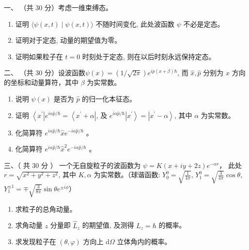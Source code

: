 
一、
	（共 30 分）考虑一维束缚态。
	\begin{enumerate}
		\item
		证明 $\langle\psi(x, t) \mid \psi(x, t)\rangle$ 不随时间变化, 此处波函数 $\psi$ 不必是定态。
		\item 
		证明对于定态, 动量的期望值为零。
		\item 
		证明如果粒子在 $t=0$ 时刻处于定态, 则在以后时刻永远保持定态。
		
		
		
	\end{enumerate}

二、	（共 30 分）设波函数$\psi(x)=(1 / \sqrt{2 \pi}) e^{i p(x+\beta) \hbar}$, 而 $\hat{x}, \hat{p}$ 分别为 $x$ 方向的坐标和动量算符，其中 $\beta$ 为实常数。
\begin{enumerate}
	\item
说明 $\psi(x)$ 是否为 $\hat{p}$ 的归一化本征态。
\item 
证明 $\left\langle x^{\prime}\right| e^{i \alpha \hat{p} / \hbar}=\left\langle x^{\prime}+\alpha\right|$, 及 $e^{i \alpha \hat{p} / \hbar}\left|x^{\prime}\right\rangle=\left|x^{\prime}-\alpha\right\rangle$, 其中 $\alpha$ 为实常数。
\item 
化简算符 $e^{i \alpha \hat{p} / \hbar} \hat{x} e^{-i \alpha \hat{p} / \hbar}$ 。
\item 
化简算符 $e^{i \alpha \hat{p} / \hbar} \hat{x}^{2} e^{-i \alpha \hat{p} / \hbar}$ 。

\end{enumerate}


三、（ 共 30 分 ） 一个无自旋粒子的波函数为 $\psi=K(x+i y+2 z) e^{-\alpha r} $， 此处 $r=\sqrt{x^{2}+y^{2}+z^{2}}$, 其中 $K, \alpha$ 为实常数。（球谐函数: $Y_{0}^{0}=\sqrt{\frac{1}{4 \pi}}$, $ Y_{1}^{0}=\sqrt{\frac{3}{4 \pi}} \cos \theta$, 
$Y_{1}^{\pm 1}=\mp \sqrt{\frac{3}{8 \pi}} \sin \theta e^{\pm i \phi} $）
\begin{enumerate}
	\item
	求粒子的总角动量。
	\item 
	求角动量 $z$ 分量即 $\hat{L}_{z}$ 的期望值, 及测得 $L_{z}=\hbar$ 的概率。
	\item 
	求发现粒子在 $(\theta, \varphi)$ 方向上 $\text{d}  \Omega$ 立体角内的概率。
	
	
	
\end{enumerate}

